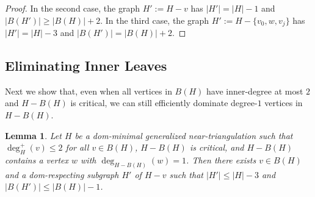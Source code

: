 \documentclass{article}
\newtheorem{lem}{Lemma}
\theoremstyle{definition}
\begin{document}
\begin{proof}
  In the second case, the graph $H':=H-v$ has $|H'|=|H|-1$ and $|B(H')|\ge |B(H)|+2$. In the third case, the graph $H':=H-\{v_0,w,v_j\}$ has $|H'|=|H|-3$ and $|B(H')|=|B(H)|+2$.
\end{proof}


\subsection{Eliminating Inner Leaves}
\label{one_kill_sec}

Next we show that, even when all vertices in $B(H)$ have inner-degree at most $2$ and $H-B(H)$ is critical, we can still efficiently dominate degree-$1$ vertices in $H-B(H)$.


\begin{lem}\label{leaf_killer}
  Let $H$ be a dom-minimal generalized near-triangulation such that $\deg^+_H(v)\le 2$ for all $v\in B(H)$, $H-B(H)$ is critical, and $H-B(H)$ contains a vertex $w$ with $\deg_{H-B(H)}(w)=1$.  Then there exists $v\in B(H)$ and a dom-respecting subgraph $H'$ of $H-v$ such that $|H'|\le |H|-3$ and $|B(H')|\le |B(H)|-1$.
\end{lem}
\end{document}
